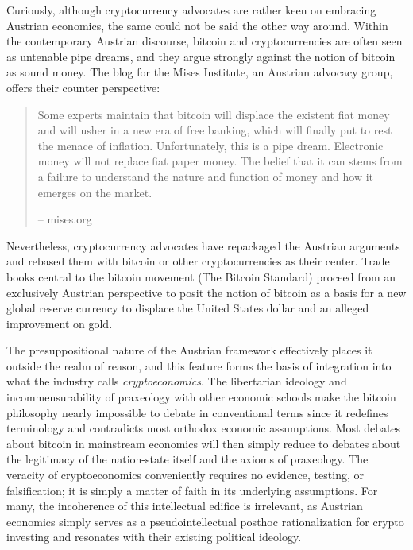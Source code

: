 Curiously, although cryptocurrency advocates are rather keen on embracing
Austrian economics, the same could not be said the other way around. Within the
contemporary Austrian discourse, bitcoin and cryptocurrencies are often seen as
untenable pipe dreams, and they argue strongly against the notion of bitcoin as
sound money. The blog for the Mises Institute, an Austrian advocacy group,
offers their counter perspective:


\begin{quote}
Some experts maintain that bitcoin will displace the existent fiat money
and will usher in a new era of free banking, which will finally put to
rest the menace of inflation. Unfortunately, this is a pipe dream.
Electronic money will not replace fiat paper money. The belief that it
can stems from a failure to understand the nature and function of money
and how it emerges on the market.
\begin{flushright}
-- mises.org
\end{flushright}
\end{quote}

Nevertheless, cryptocurrency advocates have repackaged the Austrian arguments
and rebased them with bitcoin or other cryptocurrencies as their center. Trade
books central to the bitcoin movement (The Bitcoin Standard) proceed from an
exclusively Austrian perspective to posit the notion of bitcoin as a basis for a
new global reserve currency to displace the United States dollar and an alleged
improvement on gold.

The presuppositional nature of the Austrian framework effectively places it
outside the realm of reason, and this feature forms the basis of integration
into what the industry calls \textit{cryptoeconomics}. The libertarian ideology
and incommensurability of praxeology with other economic schools make the
bitcoin philosophy nearly impossible to debate in conventional terms since it
redefines terminology and contradicts most orthodox economic assumptions. Most
debates about bitcoin in mainstream economics will then simply reduce to debates
about the legitimacy of the nation-state itself and the axioms of praxeology.
The veracity of cryptoeconomics conveniently requires no evidence, testing, or
falsification; it is simply a matter of faith in its underlying assumptions. For
many, the incoherence of this intellectual edifice is irrelevant, as Austrian
economics simply serves as a pseudointellectual posthoc rationalization for
crypto investing and resonates with their existing political ideology.

